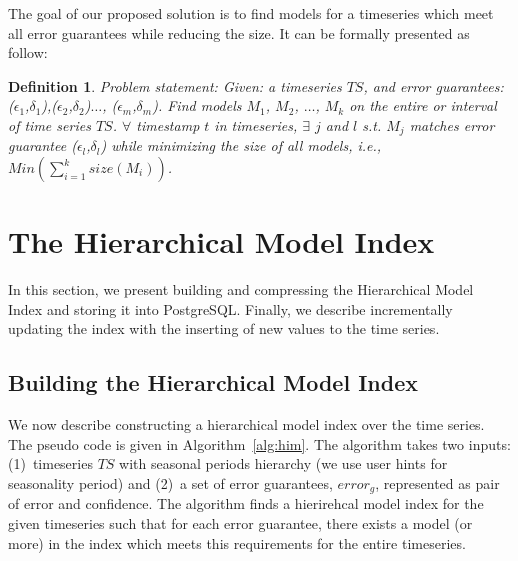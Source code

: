 \documentclass[10pt,conference,letterpaper]{IEEEtran}
\newcommand{\LN}{hierarchical model index}
\newcommand{\LNs}{hierarchical model index }
\newtheorem{mydef}{Definition}
\begin{document}
The goal of our proposed solution is to find models for a timeseries which meet all error guarantees while reducing the size. It can be formally presented as follow:
\begin{mydef} Problem statement: Given: a timeseries $TS$, and error guarantees: ($\epsilon_1$,$\delta_1$),($\epsilon_2$,$\delta_2$)$\dots$, ($\epsilon_m$,$\delta_m$). Find models $M_1$, $M_2$, $\dots$, $M_k$ on the entire or interval of time series $TS$. 
$\forall$ timestamp $t$ in timeseries,  $\exists$ $j$ and $l$ s.t. $M_j$ matches error guarantee ($\epsilon_l$,$\delta_l$) while minimizing the size of all models, i.e.,  $Min(\sum^k_{i=1}{size(M_i)})$.
\end{mydef}


\section{The Hierarchical Model Index}
\label{sec:building}
In this section, we present building and compressing the  Hierarchical Model Index and storing it into PostgreSQL. Finally, we describe incrementally updating the index with the inserting of new values to the time series.%
 
 
 \subsection{Building the Hierarchical Model Index}
We now describe constructing a \LNs over the time series. The pseudo code is given in Algorithm~\ref{alg:him}. The algorithm takes two inputs: (1)~timeseries $TS$ with seasonal periods hierarchy (we use user hints for seasonality period) and (2)~a set of error guarantees, $error_g$, represented as pair of error and confidence. 
The algorithm finds a hierirehcal model index for the given timeseries such that for each error guarantee, there exists a model (or more) in the index which meets this requirements for the entire timeseries.
\end{document}

